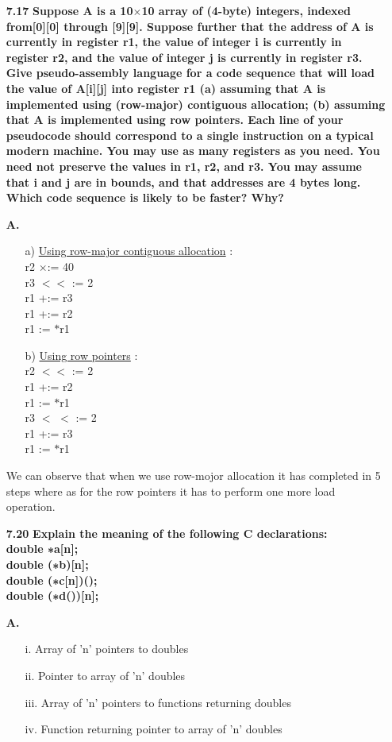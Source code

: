 \documentclass[letterpaper]{article}
\begin{document}
\begin{large}
\begin{flushleft}
\begin{enumerate}
\item[\textbf{7.17}]
\textbf{Suppose A is a 10$\times$10 array of (4-byte) integers, indexed from[0][0] through [9][9]. Suppose further that the address of A is currently in register r1, the value of integer i is currently in register r2, and the value of integer j is currently in register r3. Give pseudo-assembly language for a code sequence that will load the value of A[i][j] into register r1 (a) assuming that A is implemented using (row-major) contiguous allocation; (b) assuming that A is implemented using row pointers. Each line of your pseudocode should correspond to a single instruction on a typical modern machine. You may use as many registers as you need. You need not preserve the values in r1, r2, and r3. You may assume that i and j are in bounds, and that addresses are 4 bytes long. Which code sequence is likely to be faster? Why?}
\item[\textbf{A.}]
\begin{enumerate}
\item[a)]
\underline{Using row-major contiguous allocation} :\\[0.1in]
r2 $\times$:= 40\\
r3 $<<$ := 2\\
r1 +:= r3\\
r1 +:= r2\\
r1 := $\ast$r1\\
\item[b)]
\underline{Using row pointers} :\\[0.1in]
r2 $<<$ := 2\\
r1 +:= r2\\
r1 := $\ast$r1\\
r3 $<$ $<$ := 2\\
r1 +:= r3\\
r1 := $\ast$r1\\
\end{enumerate}
We can observe that when we use row-mojor allocation it has completed in 5 steps where as for the row pointers it has to perform one more load operation.\\[0.2in]

\item[\textbf{7.20}]
\textbf{Explain the meaning of the following C declarations:\\
double ∗a[n];\\
double (∗b)[n];\\
double (∗c[n])();\\
double (∗d())[n];\\}
\item[\textbf{A.}]
\begin{enumerate}
\item[i.] Array of ’n’ pointers to doubles
\item[ii.] Pointer to array of ’n’ doubles
\item[iii.] Array of ’n’ pointers to functions returning doubles
\item[iv.] Function returning pointer to array of ’n’ doubles
\end{enumerate}


\end{enumerate}
\end{flushleft}
\end{large}
\end{document}
